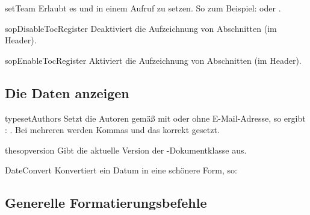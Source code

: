 \documentclass[useartcl,notoc]{sopra-paper}
\begin{document}
\begin{command}{setTeam}{}
    Erlaubt es  und  in einem Aufruf zu setzen.
    So zum Beispiel:  oder
    .
\end{command}

\begin{command}{sopDisableTocRegister}{}
    Deaktiviert die Aufzeichnung von Abschnitten (im Header).
\end{command}

\begin{command}{sopEnableTocRegister}{}
    Aktiviert die Aufzeichnung von Abschnitten (im Header).
\end{command}

\subsection{Die Daten anzeigen}

\begin{command}{typesetAuthors}{}
    Setzt die Autoren gemäß  mit oder
    ohne E-Mail-Adresse, so ergibt : \typesetAuthors.
    Bei mehreren werden Kommas und das  korrekt gesetzt.
\end{command}

\begin{command}{thesopversion}{}
    Gibt die aktuelle Version der -Dokumentklasse aus. 
\end{command}

\begin{command}{DateConvert}{}
    Konvertiert ein Datum in eine schönere Form, so:
\begin{plainlatex}[morekeywords={[5]{\\DateConvert}}]
\end{plainlatex}
\end{command}

\subsection{Generelle Formatierungsbefehle}
\end{document}

